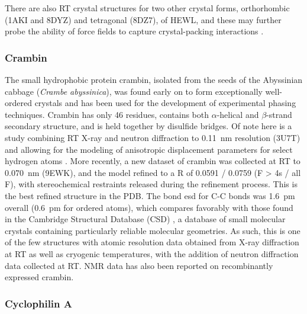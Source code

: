 \documentclass[9pt,review]{livecoms}
\begin{document}
There are also RT crystal structures for two other crystal forms, orthorhombic (1AKI and 8DYZ) and tetragonal (8DZ7), of HEWL, and these may further probe the ability of force fields to capture crystal-packing interactions \cite{meisburger_robust_2023}.

\subsubsection{Crambin}
\label{sub2:crambin}

The small hydrophobic protein crambin, isolated from the seeds of the Abyssinian cabbage (\textit{Crambe abyssinica}), was found early on to form exceptionally well-ordered crystals \cite{teeter_water_1984} and has been used for the development of experimental phasing techniques.
Crambin has only 46 residues, contains both $\alpha$-helical and $\beta$-strand secondary structure, and is held together by disulfide bridges.
Of note here is a study combining RT X-ray and neutron diffraction to \qty{0.11}{\nano\meter} resolution (3U7T) and allowing for the modeling of anisotropic displacement parameters for select hydrogen atoms \cite{chen_room-temperature_2012}.
More recently, a new dataset of crambin was collected at RT to \qty{0.070}{\nano\meter} (9EWK), and the model refined to a R of 0.0591 / 0.0759 (F > 4s / all F), with stereochemical restraints released during the refinement process.
This is the best refined structure in the PDB.
The bond esd for C-C bonds was \qty{1.6}{\pico\meter} overall (\qty{0.6}{\pico\meter} for ordered atoms), which compares favorably with those found in the Cambridge Structural Database (CSD) \cite{groom_cambridge_2016}, a database of small molecular crystals containing particularly reliable molecular geometries.
As such, this is one of the few structures with atomic resolution data obtained from X-ray diffraction at RT as well as cryogenic temperatures, with the addition of neutron diffraction data collected at RT.
NMR data has also been reported on recombinantly expressed crambin.

\subsubsection{Cyclophilin A}
\label{sub2:cypa}
\end{document}
